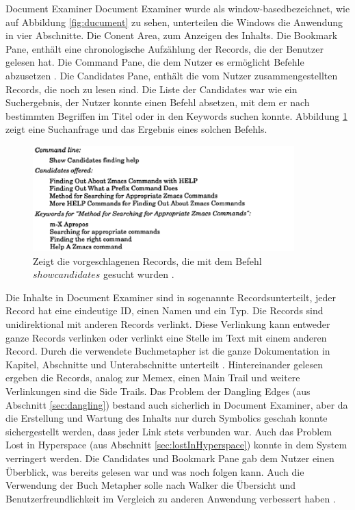 \begin{section}{Document Examiner}
Document Examiner wurde als \glqq window-based\grqq{ }bezeichnet, wie auf Abbildung \ref{fig:ducument} zu sehen, unterteilen die Windows die Anwendung in vier Abschnitte. Die \glqq Conent Area\grqq, zum Anzeigen des Inhalts. Die \glqq Bookmark Pane\grqq, enthält eine chronologische Aufzählung der Records, die der Benutzer gelesen hat. Die \glqq Command Pane\grqq, die dem Nutzer es ermöglicht Befehle abzusetzen \cite{Walker1987}. Die \glqq Candidates Pane\grqq, enthält die vom Nutzer zusammengestellten Records, die noch zu lesen sind. Die Liste der Candidates war wie ein Suchergebnis, der Nutzer konnte einen Befehl absetzen, mit dem er nach bestimmten Begriffen im Titel oder in den Keywords suchen konnte. Abbildung \ref{fig:candidates} zeigt eine Suchanfrage und das Ergebnis eines solchen Befehls.

\begin{figure}[H]
	\centering
	\includegraphics[width=0.9\textwidth]{image/candidates}
	\caption{Zeigt die vorgeschlagenen Records, die mit dem Befehl $show candidates$ gesucht wurden \cite{Walker1987}.}
	\label{fig:candidates}
\end{figure}

Die Inhalte in Document Examiner sind in sogenannte \glqq Records\grqq{ }unterteilt, jeder Record hat eine eindeutige ID, einen Namen und ein Typ. Die Records sind unidirektional mit anderen Records verlinkt. Diese Verlinkung kann entweder ganze Records verlinken oder verlinkt eine Stelle im Text mit einem anderen Record. Durch die verwendete Buchmetapher ist die ganze Dokumentation in Kapitel, Abschnitte und Unterabschnitte unterteilt \cite{Walker1987}. Hintereinander gelesen ergeben die Records, analog zur Memex, einen Main Trail und weitere Verlinkungen sind die Side Trails. Das Problem der Dangling Edges (aus Abschnitt \ref{sec:dangling}) bestand auch sicherlich in Document Examiner, aber da die Erstellung und Wartung des Inhalts nur durch Symbolics geschah \cite{Walker1987} konnte sichergestellt werden, dass jeder Link stets verbunden war. Auch das Problem Lost in Hyperspace (aus Abschnitt \ref{sec:lostInHyperspace}) konnte in dem System verringert werden. Die Candidates und Bookmark Pane gab dem Nutzer einen Überblick, was bereits gelesen war und was noch folgen kann. Auch die Verwendung der Buch Metapher solle nach Walker die Übersicht und Benutzerfreundlichkeit im Vergleich zu anderen Anwendung verbessert haben \cite{Walker1987}.

\end{section}

